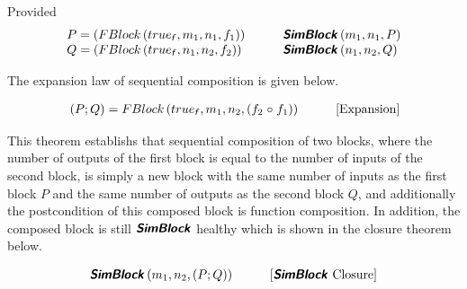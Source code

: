 Provided 
   \begin{align*}
       \begin{array}[]{ll}
           P = \left(FBlock\left( \logtrue{f}, m_1, n_1, f_1\right)\right) & \qquad \healthy{SimBlock}\left(m_1, n_1, P\right) \\ 
           Q = \left(FBlock\left( \logtrue{f}, n_1, n_2, f_2\right)\right) & \qquad \healthy{SimBlock}\left(n_1, n_2, Q\right) \\ 
       \end{array}
   \end{align*}

The expansion law of sequential composition is given below.
\begin{theorem}[Expansion]
   \begin{align*}
       &\left(P \dcomp Q \right) = FBlock\left( \logtrue{f}, m_1, n_2, (f_2 \circ f_1)\right) & \tag*{[Expansion]}
   \end{align*}
    \label{thm:seq_exp}
\end{theorem}
This theorem establishs that sequential composition of two blocks, where the number of outputs of the first block is equal to the number of inputs of the second block, is simply a new block with the same number of inputs as the first block $P$ and the same number of outputs as the second block $Q$, and additionally the postcondition of this composed block is function composition. In addition, the composed block is still $\hbox{\textbf{\textsf{\textsl{SimBlock}}}}$ healthy which is shown in the closure theorem below.

\begin{theorem}[Closure]
   \begin{align*}
       &\healthy{SimBlock}\left(m_1, n_2, \left(P \dcomp Q \right)\right) & \tag*{[\healthy{SimBlock} Closure]} 
   \end{align*}
    \label{thm:seq_closure}
\end{theorem}

